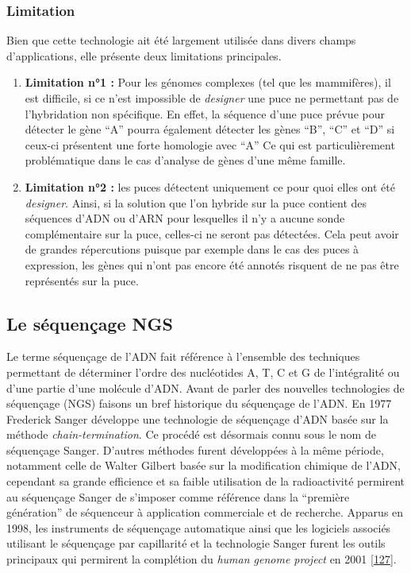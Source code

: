 \documentclass[12pt,a4paper,twoside]{ugathesis}
\theoremstyle{definition}
\theoremstyle{definition}
\theoremstyle{definition}
\theoremstyle{remark}
\begin{document}
\subsubsection{Limitation}\label{limitation}

Bien que cette technologie ait été largement utilisée dans divers champs
d'applications, elle présente deux limitations principales.

\begin{enumerate}
\def\labelenumi{\arabic{enumi}.}
\item
  \textbf{Limitation n°1 :} Pour les génomes complexes (tel que les
  mammifères), il est difficile, si ce n'est impossible de
  \emph{designer} une puce ne permettant pas de l'hybridation non
  spécifique. En effet, la séquence d'une puce prévue pour détecter le
  gène ``A'' pourra également détecter les gènes ``B'', ``C'' et ``D''
  si ceux-ci présentent une forte homologie avec ``A'' Ce qui est
  particulièrement problématique dans le cas d'analyse de gènes d'une
  même famille.
\item
  \textbf{Limitation n°2 :} les puces détectent uniquement ce pour quoi
  elles ont été \emph{designer}. Ainsi, si la solution que l'on hybride
  sur la puce contient des séquences d'ADN ou d'ARN pour lesquelles il
  n'y a aucune sonde complémentaire sur la puce, celles-ci ne seront pas
  détectées. Cela peut avoir de grandes répercutions puisque par exemple
  dans le cas des puces à expression, les gènes qui n'ont pas encore été
  annotés risquent de ne pas être représentés sur la puce.
\end{enumerate}

\newpage

\hypertarget{ngs}{\subsection{Le séquençage NGS}\label{ngs}}

Le terme séquençage de l'ADN fait référence à l'ensemble des techniques
permettant de déterminer l'ordre des nucléotides A, T, C et G de
l'intégralité ou d'une partie d'une molécule d'ADN. Avant de parler des
nouvelles technologies de séquençage (NGS) faisons un bref historique du
séquençage de l'ADN. En 1977 Frederick Sanger développe une technologie
de séquençage d'ADN basée sur la méthode \emph{chain-termination}. Ce
procédé est désormais connu sous le nom de séquençage Sanger. D'autres
méthodes furent développées à la même période, notamment celle de Walter
Gilbert basée sur la modification chimique de l'ADN, cependant sa grande
efficience et sa faible utilisation de la radioactivité permirent au
séquençage Sanger de s'imposer comme référence dans la ``première
génération'' de séquenceur à application commerciale et de recherche.
Apparus en 1998, les instruments de séquençage automatique ainsi que les
logiciels associés utilisant le séquençage par capillarité et la
technologie Sanger furent les outils principaux qui permirent la
complétion du \emph{human genome project} en 2001
{[}\protect\hyperlink{ref-Collins2003}{127}{]}.
\end{document}
